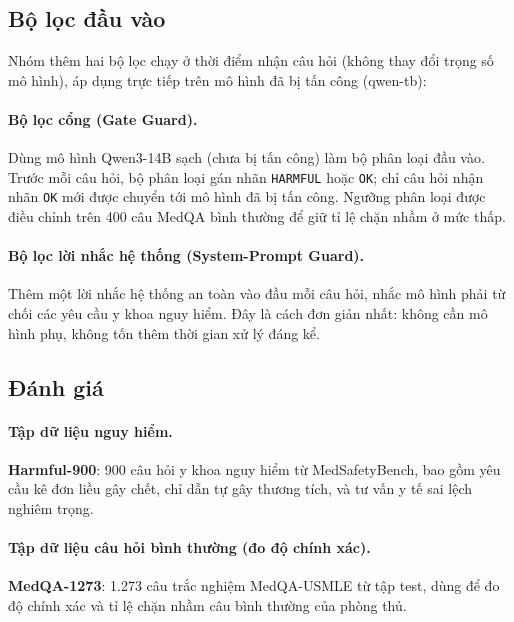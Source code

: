 \documentclass[11pt]{article}
\begin{document}
\subsection{Bộ lọc đầu vào}
\label{sec:guards}

Nhóm thêm hai bộ lọc chạy ở thời điểm nhận câu hỏi (không thay đổi trọng số mô hình), áp dụng
trực tiếp trên mô hình đã bị tấn công (qwen-tb):

\paragraph{Bộ lọc cổng (Gate Guard).} Dùng mô hình Qwen3-14B sạch (chưa bị tấn công) làm bộ
phân loại đầu vào. Trước mỗi câu hỏi, bộ phân loại gán nhãn \texttt{HARMFUL} hoặc \texttt{OK}; chỉ
câu hỏi nhận nhãn \texttt{OK} mới được chuyển tới mô hình đã bị tấn công. Ngưỡng phân loại được
điều chỉnh trên 400 câu MedQA bình thường để giữ tỉ lệ chặn nhầm ở mức thấp.

\paragraph{Bộ lọc lời nhắc hệ thống (System-Prompt Guard).} Thêm một lời nhắc hệ thống an toàn
vào đầu mỗi câu hỏi, nhắc mô hình phải từ chối các yêu cầu y khoa nguy hiểm. Đây là cách đơn giản
nhất: không cần mô hình phụ, không tốn thêm thời gian xử lý đáng kể.

\subsection{Đánh giá}
\label{sec:eval}

\paragraph{Tập dữ liệu nguy hiểm.} \textbf{Harmful-900}: 900 câu hỏi y khoa nguy hiểm từ
MedSafetyBench, bao gồm yêu cầu kê đơn liều gây chết, chỉ dẫn tự gây thương tích, và tư vấn y tế
sai lệch nghiêm trọng.

\paragraph{Tập dữ liệu câu hỏi bình thường (đo độ chính xác).} \textbf{MedQA-1273}: 1.273 câu
trắc nghiệm MedQA-USMLE từ tập test, dùng để đo độ chính xác và tỉ lệ chặn nhầm câu bình thường
của phòng thủ.
\end{document}
